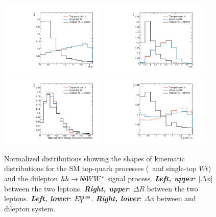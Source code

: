 \begin{figure}[!htb]
    \begin{center}
        \includegraphics[width=0.45\textwidth]{figures/search_hh/signal_pheno/shape_plots/hh_shape_plot_dphi_ll}
        \includegraphics[width=0.45\textwidth]{figures/search_hh/signal_pheno/shape_plots/hh_shape_plot_dRll}
        \includegraphics[width=0.45\textwidth]{figures/search_hh/signal_pheno/shape_plots/hh_shape_plot_met}
        \includegraphics[width=0.45\textwidth]{figures/search_hh/signal_pheno/shape_plots/hh_shape_plot_dphi_met_ll}
        \caption{
            Normalized distributions showing the shapes of kinematic distributions for the SM
            top-quark processes (\ttbar~and single-top $Wt$) and the diilepton $hh \rightarrow bbWW^*$ signal process.
            \textit{\textbf{Left, upper}}: $|\Delta \phi|$ between the two leptons.
            \textit{\textbf{Right, upper}}: $\Delta R$ between the two leptons.
            \textit{\textbf{Left, lower}}: $E_{\text{T}}^{\text{miss}}$.
            \textit{\textbf{Right, lower}}: $\Delta \phi$ between \met and dilepton system.
        }
        \label{fig:hh_kin_1}
    \end{center}
\end{figure}

